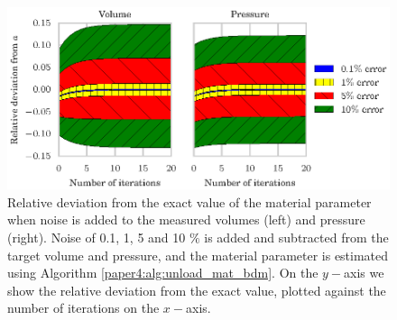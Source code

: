 \begin{figure}[htbp]
  \centering
    \includegraphics{figures/materror_noise}
   \caption{\label{paper4:fig:unloaded_materror_noise}  Relative deviation from the
     exact value of the material parameter when noise is added
     to the measured volumes (left)
     and pressure (right). Noise of 0.1, 1, 5 and 10 $\%$
     is added and subtracted from the target volume and pressure, and
     the material parameter is estimated using Algorithm
     \ref{paper4:alg:unload_mat_bdm}. On the $y-$axis we show the
     relative deviation from the exact value, plotted against the number
   of iterations on the $x-$axis. }
\end{figure} 


\newpage


% 





